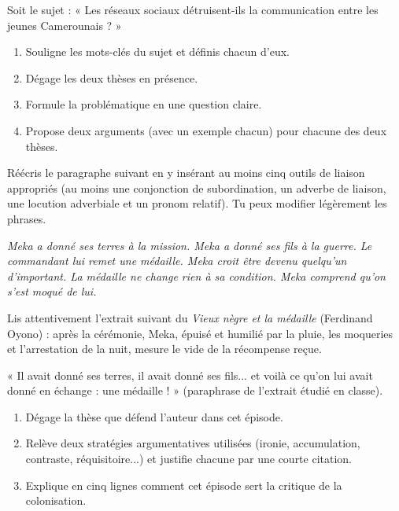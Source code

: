 \documentclass[11pt]{article}
\begin{document}
\begin{exercice}
Soit le sujet : « Les réseaux sociaux détruisent-ils la communication entre les jeunes Camerounais ? »
\begin{enumerate}
\item Souligne les mots-clés du sujet et définis chacun d'eux.
\item Dégage les deux thèses en présence.
\item Formule la problématique en une question claire.
\item Propose deux arguments (avec un exemple chacun) pour chacune des deux thèses.
\end{enumerate}
\end{exercice}

\begin{exercice}
Réécris le paragraphe suivant en y insérant au moins cinq outils de liaison appropriés (au moins une conjonction de subordination, un adverbe de liaison, une locution adverbiale et un pronom relatif). Tu peux modifier légèrement les phrases.

\emph{Meka a donné ses terres à la mission. Meka a donné ses fils à la guerre. Le commandant lui remet une médaille. Meka croit être devenu quelqu'un d'important. La médaille ne change rien à sa condition. Meka comprend qu'on s'est moqué de lui.}
\end{exercice}

\begin{exercice}
Lis attentivement l'extrait suivant du \emph{Vieux nègre et la médaille} (Ferdinand Oyono) : après la cérémonie, Meka, épuisé et humilié par la pluie, les moqueries et l'arrestation de la nuit, mesure le vide de la récompense reçue.

« Il avait donné ses terres, il avait donné ses fils... et voilà ce qu'on lui avait donné en échange : une médaille ! » (paraphrase de l'extrait étudié en classe).
\begin{enumerate}
\item Dégage la thèse que défend l'auteur dans cet épisode.
\item Relève deux stratégies argumentatives utilisées (ironie, accumulation, contraste, réquisitoire...) et justifie chacune par une courte citation.
\item Explique en cinq lignes comment cet épisode sert la critique de la colonisation.
\end{enumerate}
\end{exercice}
\end{document}
